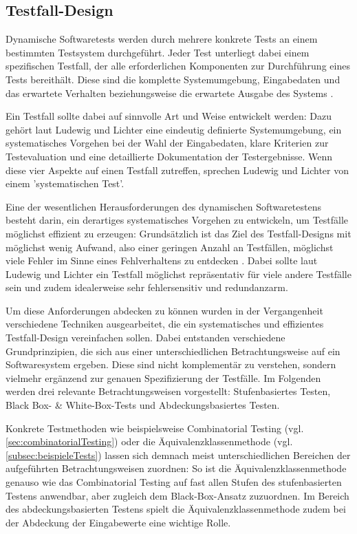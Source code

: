 \subsection{Testfall-Design}\label{subsec:testfallDesign}

Dynamische Softwaretests werden durch mehrere konkrete Tests an einem bestimmten Testsystem durchgeführt. Jeder Test unterliegt dabei einem spezifischen Testfall, der alle erforderlichen Komponenten zur Durchführung eines Tests bereithält. Diese sind die komplette Systemumgebung, Eingabedaten und das erwartete Verhalten beziehungsweise die erwartete Ausgabe des Systems \cite[S. 86]{schneider2012abenteuer}. 

Ein Testfall sollte dabei auf sinnvolle Art und Weise entwickelt werden: Dazu gehört laut Ludewig und Lichter \cite[S. 480]{ludewig2010software} eine eindeutig definierte Systemumgebung, ein systematisches Vorgehen bei der Wahl der Eingabedaten, klare Kriterien zur Testevaluation und eine detaillierte Dokumentation der Testergebnisse. Wenn diese vier Aspekte auf einen Testfall zutreffen, sprechen Ludewig und Lichter von einem 'systematischen Test'.

Eine der wesentlichen Herausforderungen des dynamischen Softwaretestens besteht darin, ein derartiges systematisches Vorgehen zu entwickeln, um Testfälle möglichst effizient zu erzeugen: Grundsätzlich ist das Ziel des Testfall-Designs mit möglichst wenig Aufwand, also einer geringen Anzahl an Testfällen, möglichst viele Fehler im Sinne eines Fehlverhaltens zu entdecken \cite[S. 498]{ludewig2010software}. Dabei sollte laut Ludewig und Lichter \cite[S. 498]{ludewig2010software} ein Testfall möglichst repräsentativ für viele andere Testfälle sein und zudem idealerweise sehr fehlersensitiv und redundanzarm.

Um diese Anforderungen abdecken zu können wurden in der Vergangenheit verschiedene Techniken ausgearbeitet, die ein systematisches und effizientes Testfall-Design vereinfachen sollen. Dabei entstanden verschiedene Grundprinzipien, die sich aus einer unterschiedlichen Betrachtungsweise auf ein Softwaresystem ergeben. Diese sind nicht komplementär zu verstehen, sondern vielmehr ergänzend zur genauen Spezifizierung der Testfälle. Im Folgenden werden drei relevante Betrachtungsweisen vorgestellt: Stufenbasiertes Testen, Black Box- \& White-Box-Tests und Abdeckungsbasiertes Testen.

Konkrete Testmethoden wie beispielsweise Combinatorial Testing (vgl. \autoref{sec:combinatorialTesting}) oder die Äquivalenzklassenmethode (vgl. \autoref{subsec:beispieleTests}) lassen sich demnach meist unterschiedlichen Bereichen der aufgeführten Betrachtungsweisen zuordnen: So ist die Äquivalenzklassenmethode genauso wie das Combinatorial Testing auf fast allen Stufen des stufenbasierten Testens anwendbar, aber zugleich dem Black-Box-Ansatz zuzuordnen. Im Bereich des abdeckungsbasierten Testens spielt die Äquivalenzklassenmethode zudem bei der Abdeckung der Eingabewerte eine wichtige Rolle.

